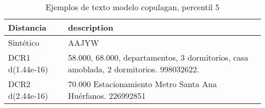 \begin{table}[H]
\centering
\fontsize{10}{14}\selectfont
\caption{Ejemplos de texto modelo copulagan, percentil 5}
\label{table-example-economicos-b-3-copulagan-5p-text}
\begin{tabular}{|l|m{35em}|}
\hline
\rowcolor[gray]{0.8}
Distancia & description \\
\hline Sintético & AAJYW \\
\hline DCR1 d(1.44e-16) & 58.000, 68.000, departamentos, 3 dormitorios, casa amoblada, 2 dormitorios. 998032622. \\
\hline DCR2 d(2.44e-16) & 70.000 Estacionamiento Metro Santa Ana Hu\'erfanos. 226992851 \\
\hline
\end{tabular}
\end{table}
